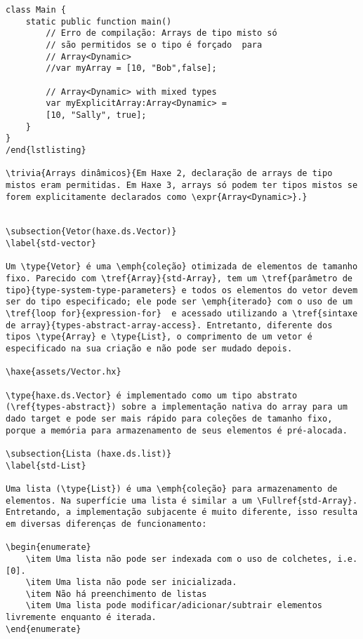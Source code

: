 \begin{lstlisting}
class Main {
    static public function main()
        // Erro de compilação: Arrays de tipo misto só
        // são permitidos se o tipo é forçado  para
        // Array<Dynamic>
        //var myArray = [10, "Bob",false];

        // Array<Dynamic> with mixed types
        var myExplicitArray:Array<Dynamic> =
        [10, "Sally", true];
    }
}
/end{lstlisting}

\trivia{Arrays dinâmicos}{Em Haxe 2, declaração de arrays de tipo mistos eram permitidas. Em Haxe 3, arrays só podem ter tipos mistos se forem explicitamente declarados como \expr{Array<Dynamic>}.}


\subsection{Vetor(haxe.ds.Vector)}
\label{std-vector}

Um \type{Vetor} é uma \emph{coleção} otimizada de elementos de tamanho fixo. Parecido com \tref{Array}{std-Array}, tem um \tref{parâmetro de tipo}{type-system-type-parameters} e todos os elementos do vetor devem ser do tipo especificado; ele pode ser \emph{iterado} com o uso de um \tref{loop for}{expression-for}  e acessado utilizando a \tref{sintaxe de array}{types-abstract-array-access}. Entretanto, diferente dos tipos \type{Array} e \type{List}, o comprimento de um vetor é especificado na sua criação e não pode ser mudado depois.

\haxe{assets/Vector.hx}

\type{haxe.ds.Vector} é implementado como um tipo abstrato (\ref{types-abstract}) sobre a implementação nativa do array para um dado target e pode ser mais rápido para coleções de tamanho fixo, porque a memória para armazenamento de seus elementos é pré-alocada.

\subsection{Lista (haxe.ds.list)}
\label{std-List}

Uma lista (\type{List}) é uma \emph{coleção} para armazenamento de elementos. Na superfície uma lista é similar a um \Fullref{std-Array}. Entretando, a implementação subjacente é muito diferente, isso resulta em diversas diferenças de funcionamento:

\begin{enumerate}
    \item Uma lista não pode ser indexada com o uso de colchetes, i.e. [0].
    \item Uma lista não pode ser inicializada.
    \item Não há preenchimento de listas
    \item Uma lista pode modificar/adicionar/subtrair elementos livremente enquanto é iterada.
\end{enumerate}


\end{lstlisting}
